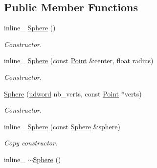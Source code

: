 \subsection*{Public Member Functions}
\begin{DoxyCompactItemize}
\item 
inline\+\_\+ \hyperlink{classSphere_aa2daf4997e9f4776d7559b5b048f2394}{Sphere} ()\hypertarget{classSphere_aa2daf4997e9f4776d7559b5b048f2394}{}\label{classSphere_aa2daf4997e9f4776d7559b5b048f2394}

\begin{DoxyCompactList}\small\item\em Constructor. \end{DoxyCompactList}\item 
inline\+\_\+ \hyperlink{classSphere_a82acc3b6f865adc8b8a48b3dd1bb14a7}{Sphere} (const \hyperlink{classPoint}{Point} \&center, float radius)\hypertarget{classSphere_a82acc3b6f865adc8b8a48b3dd1bb14a7}{}\label{classSphere_a82acc3b6f865adc8b8a48b3dd1bb14a7}

\begin{DoxyCompactList}\small\item\em Constructor. \end{DoxyCompactList}\item 
\hyperlink{classSphere_abe502767a9200bf880010c0321bfb251}{Sphere} (\hyperlink{IceTypes_8h_a44c6f1920ba5551225fb534f9d1a1733}{udword} nb\+\_\+verts, const \hyperlink{classPoint}{Point} $\ast$verts)\hypertarget{classSphere_abe502767a9200bf880010c0321bfb251}{}\label{classSphere_abe502767a9200bf880010c0321bfb251}

\begin{DoxyCompactList}\small\item\em Constructor. \end{DoxyCompactList}\item 
inline\+\_\+ \hyperlink{classSphere_ab870c2e0a2ff480eeb0e1226e5322a01}{Sphere} (const \hyperlink{classSphere}{Sphere} \&sphere)\hypertarget{classSphere_ab870c2e0a2ff480eeb0e1226e5322a01}{}\label{classSphere_ab870c2e0a2ff480eeb0e1226e5322a01}

\begin{DoxyCompactList}\small\item\em Copy constructor. \end{DoxyCompactList}\item 
inline\+\_\+ \hyperlink{classSphere_ab99482050741f28aed9fb697c66ffaa4}{$\sim$\+Sphere} ()\hypertarget{classSphere_ab99482050741f28aed9fb697c66ffaa4}{}\label{classSphere_ab99482050741f28aed9fb697c66ffaa4}


\end{DoxyCompactItemize}
